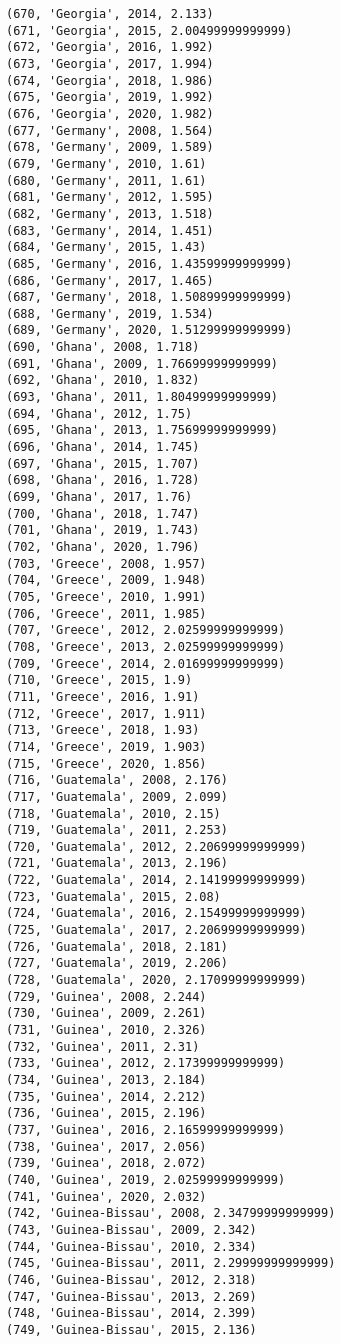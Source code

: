 \documentclass[11pt]{article}
\begin{document}
\begin{Verbatim}[commandchars=\\\{\}]
(670, 'Georgia', 2014, 2.133)
(671, 'Georgia', 2015, 2.00499999999999)
(672, 'Georgia', 2016, 1.992)
(673, 'Georgia', 2017, 1.994)
(674, 'Georgia', 2018, 1.986)
(675, 'Georgia', 2019, 1.992)
(676, 'Georgia', 2020, 1.982)
(677, 'Germany', 2008, 1.564)
(678, 'Germany', 2009, 1.589)
(679, 'Germany', 2010, 1.61)
(680, 'Germany', 2011, 1.61)
(681, 'Germany', 2012, 1.595)
(682, 'Germany', 2013, 1.518)
(683, 'Germany', 2014, 1.451)
(684, 'Germany', 2015, 1.43)
(685, 'Germany', 2016, 1.43599999999999)
(686, 'Germany', 2017, 1.465)
(687, 'Germany', 2018, 1.50899999999999)
(688, 'Germany', 2019, 1.534)
(689, 'Germany', 2020, 1.51299999999999)
(690, 'Ghana', 2008, 1.718)
(691, 'Ghana', 2009, 1.76699999999999)
(692, 'Ghana', 2010, 1.832)
(693, 'Ghana', 2011, 1.80499999999999)
(694, 'Ghana', 2012, 1.75)
(695, 'Ghana', 2013, 1.75699999999999)
(696, 'Ghana', 2014, 1.745)
(697, 'Ghana', 2015, 1.707)
(698, 'Ghana', 2016, 1.728)
(699, 'Ghana', 2017, 1.76)
(700, 'Ghana', 2018, 1.747)
(701, 'Ghana', 2019, 1.743)
(702, 'Ghana', 2020, 1.796)
(703, 'Greece', 2008, 1.957)
(704, 'Greece', 2009, 1.948)
(705, 'Greece', 2010, 1.991)
(706, 'Greece', 2011, 1.985)
(707, 'Greece', 2012, 2.02599999999999)
(708, 'Greece', 2013, 2.02599999999999)
(709, 'Greece', 2014, 2.01699999999999)
(710, 'Greece', 2015, 1.9)
(711, 'Greece', 2016, 1.91)
(712, 'Greece', 2017, 1.911)
(713, 'Greece', 2018, 1.93)
(714, 'Greece', 2019, 1.903)
(715, 'Greece', 2020, 1.856)
(716, 'Guatemala', 2008, 2.176)
(717, 'Guatemala', 2009, 2.099)
(718, 'Guatemala', 2010, 2.15)
(719, 'Guatemala', 2011, 2.253)
(720, 'Guatemala', 2012, 2.20699999999999)
(721, 'Guatemala', 2013, 2.196)
(722, 'Guatemala', 2014, 2.14199999999999)
(723, 'Guatemala', 2015, 2.08)
(724, 'Guatemala', 2016, 2.15499999999999)
(725, 'Guatemala', 2017, 2.20699999999999)
(726, 'Guatemala', 2018, 2.181)
(727, 'Guatemala', 2019, 2.206)
(728, 'Guatemala', 2020, 2.17099999999999)
(729, 'Guinea', 2008, 2.244)
(730, 'Guinea', 2009, 2.261)
(731, 'Guinea', 2010, 2.326)
(732, 'Guinea', 2011, 2.31)
(733, 'Guinea', 2012, 2.17399999999999)
(734, 'Guinea', 2013, 2.184)
(735, 'Guinea', 2014, 2.212)
(736, 'Guinea', 2015, 2.196)
(737, 'Guinea', 2016, 2.16599999999999)
(738, 'Guinea', 2017, 2.056)
(739, 'Guinea', 2018, 2.072)
(740, 'Guinea', 2019, 2.02599999999999)
(741, 'Guinea', 2020, 2.032)
(742, 'Guinea-Bissau', 2008, 2.34799999999999)
(743, 'Guinea-Bissau', 2009, 2.342)
(744, 'Guinea-Bissau', 2010, 2.334)
(745, 'Guinea-Bissau', 2011, 2.29999999999999)
(746, 'Guinea-Bissau', 2012, 2.318)
(747, 'Guinea-Bissau', 2013, 2.269)
(748, 'Guinea-Bissau', 2014, 2.399)
(749, 'Guinea-Bissau', 2015, 2.136)

\end{Verbatim}
\end{document}
